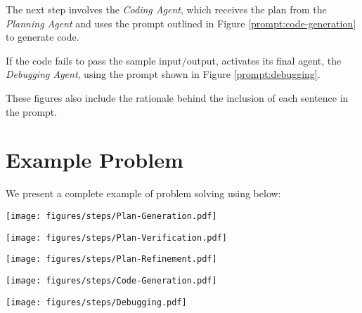 The next step involves the \emph{Coding Agent}, which receives the plan from the \emph{Planning Agent} and uses the prompt outlined in Figure \ref{prompt:code-generation} to generate code.

If the code fails to pass the sample input/output, \tool activates its final agent, the \emph{Debugging Agent}, using the prompt shown in Figure \ref{prompt:debugging}.

These figures also include the rationale behind the inclusion of each sentence in the prompt.

\section{Example Problem}
We present a complete example of problem solving using \tool below:


\begin{figure*}[h]
    \centering
    \texttt{[image: figures/steps/Plan-Generation.pdf]}
    \caption{\emph{Planning Agent}: Prompt for Plan Generation. }
    \label{prompt:plan-generation}
\end{figure*} 

\begin{figure*}[h]
    \centering
    \texttt{[image: figures/steps/Plan-Verification.pdf]}
    \caption{\emph{Planning Agent}: Prompt for Plan Verification with the help of Simulation.}
    \label{prompt:plan-verification}
\end{figure*} 

\begin{figure*}[h]
    \centering%
    \texttt{[image: figures/steps/Plan-Refinement.pdf]}
    \caption{\emph{Planning Agent}: Prompt for Plan Refinement.}
    \label{prompt:plan-refinement}
\end{figure*} 

\begin{figure*}[h]
    \centering%
    \texttt{[image: figures/steps/Code-Generation.pdf]}
    \caption{\emph{Coding Agent}: Prompt for Code Generation.}
    \label{prompt:code-generation}
\end{figure*} 
\onecolumn

\begin{figure*}[h]
    \centering%
    \texttt{[image: figures/steps/Debugging.pdf]}
    \caption{\emph{Debugging Agent}: Prompt for Debugging.}
    \label{prompt:debugging}    
\end{figure*}


\begin{tcolorbox}[breakable]
\label{app:example-problem}
    
\end{tcolorbox}
\twocolumn  %